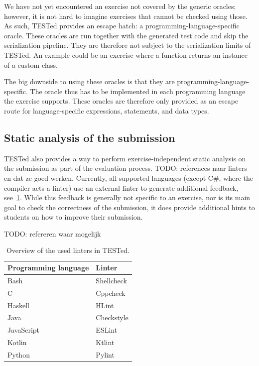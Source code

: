 \documentclass[../main]{subfiles}
\begin{document}
We have not yet encountered an exercise not covered by the generic oracles; however, it is not hard to imagine exercises that cannot be checked using those.
As such, TESTed provides an escape hatch: a programming-language-specific oracle.
These oracles are run together with the generated test code and skip the serialization pipeline.
They are therefore not subject to the serialization limits of TESTed.
An example could be an exercise where a function returns an instance of a custom class.

The big downside to using these oracles is that they are programming-language-specific.
The oracle thus has to be implemented in each programming language the exercise supports.
These oracles are therefore only provided as an escape route for language-specific expressions, statements, and data types.

\subsection{Static analysis of the submission}\label{subsec:static-analysis-of-the-submission}

TESTed also provides a way to perform exercise-independent static analysis on the submission as part of the evaluation process.
TODO: references naar linters en dat ze goed werken.
Currently, all supported languages (except C\#, where the compiler acts a linter) use an external linter to generate additional feedback, see~\cref{tab:linters}.
While this feedback is generally not specific to an exercise, nor is its main goal to check the correctness of the submission, it does provide additional hints to students on how to improve their submission.

TODO: refereren waar mogelijk
\begin{table}[h]
    \centering
    \caption{Overview of the used linters in TESTed.}
    \label{tab:linters}
    \begin{tabular}{|l|l|}
        \hline
        Programming language & Linter \\
        \hline
        Bash & Shellcheck  \\
        C & Cppcheck \\
        Haskell & HLint \\
        Java & Checkstyle \\
        JavaScript & ESLint \\
        Kotlin & Ktlint \\
        Python & Pylint \\
        \hline
    \end{tabular}
\end{table}
\end{document}
